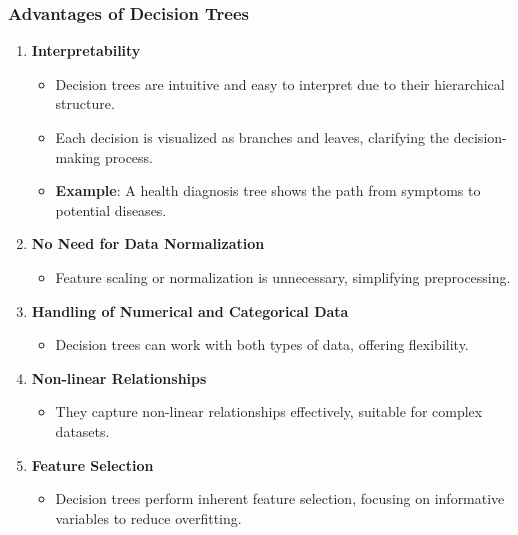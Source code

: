 \documentclass[aspectratio=169]{beamer}
\begin{document}
\begin{frame}[fragile]
    \frametitle{Advantages of Decision Trees}
    \begin{enumerate}
        \item \textbf{Interpretability}
            \begin{itemize}
                \item Decision trees are intuitive and easy to interpret due to their hierarchical structure.
                \item Each decision is visualized as branches and leaves, clarifying the decision-making process.
                \item \textbf{Example}: A health diagnosis tree shows the path from symptoms to potential diseases.
            \end{itemize}
        
        \item \textbf{No Need for Data Normalization}
            \begin{itemize}
                \item Feature scaling or normalization is unnecessary, simplifying preprocessing.
            \end{itemize}
        
        \item \textbf{Handling of Numerical and Categorical Data}
            \begin{itemize}
                \item Decision trees can work with both types of data, offering flexibility.
            \end{itemize}
        
        \item \textbf{Non-linear Relationships}
            \begin{itemize}
                \item They capture non-linear relationships effectively, suitable for complex datasets.
            \end{itemize}
        
        \item \textbf{Feature Selection}
            \begin{itemize}
                \item Decision trees perform inherent feature selection, focusing on informative variables to reduce overfitting.
            \end{itemize}
    \end{enumerate}
\end{frame}
\end{document}
